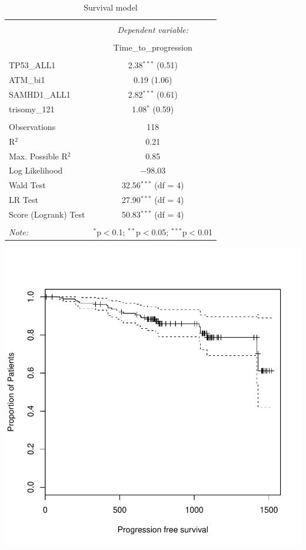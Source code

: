 \documentclass[a4paper,11pt]{article}
\begin{document}
\begin{table}[!htbp] \centering 
  \caption{Survival model} 
  \label{} 
\small 
\begin{tabular}{@{\extracolsep{5pt}}lc} 
\\[-1.8ex]\hline 
\hline \\[-1.8ex] 
 & \multicolumn{1}{c}{\textit{Dependent variable:}} \\ 
\cline{2-2} 
\\[-1.8ex] & Time\_to\_progression \\ 
\hline \\[-1.8ex] 
 TP53\_ALL1 & 2.38$^{***}$ (0.51) \\ 
  ATM\_bi1 & 0.19 (1.06) \\ 
  SAMHD1\_ALL1 & 2.82$^{***}$ (0.61) \\ 
  trisomy\_121 & 1.08$^{*}$ (0.59) \\ 
 \hline \\[-1.8ex] 
Observations & 118 \\ 
R$^{2}$ & 0.21 \\ 
Max. Possible R$^{2}$ & 0.85 \\ 
Log Likelihood & $-$98.03 \\ 
Wald Test & 32.56$^{***}$ (df = 4) \\ 
LR Test & 27.90$^{***}$ (df = 4) \\ 
Score (Logrank) Test & 50.83$^{***}$ (df = 4) \\ 
\hline 
\hline \\[-1.8ex] 
\textit{Note:}  & \multicolumn{1}{l}{$^{*}$p$<$0.1; $^{**}$p$<$0.05; $^{***}$p$<$0.01} \\ 
\end{tabular} 
\end{table} 
\includegraphics{HICF1_Finalreportv6-031}
\end{document}
